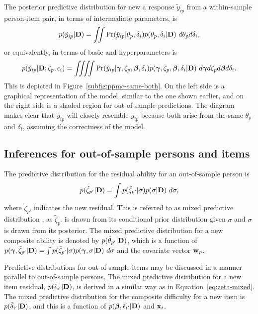 \documentclass[12pt, letterpaper]{article}
\begin{document}
The posterior predictive distribution \cite{rubin1984bayesianly} for new a response $\tilde y_{ip}$ from a within-sample person-item pair, in terms of intermediate parameters, is
\begin{equation}
	p(\tilde y_{ip} | \mathbf{D}) =
	\iint
		\Pr (\tilde y_{ip} | \theta_p, \delta_i)
		p(\theta_p, \delta_i | \mathbf{D})
	~d\theta_p d\delta_i
,\end{equation}
or equivalently, in terms of basic and hyperparameters is
\begin{equation} \label{eq:yrep-post}
	p(\tilde y_{ip} | \mathbf{D};  \zeta_p, \epsilon_i) =
	\iiiint
		\Pr (\tilde y_{ip} | \boldsymbol{\gamma}, \zeta_p, \boldsymbol{\beta}, \delta_i)
		p(\boldsymbol{\gamma}, \zeta_p, \boldsymbol{\beta}, \delta_i | \mathbf{D})
	~d\boldsymbol{\gamma} d\zeta_p d\boldsymbol{\beta} d\delta_i
.\end{equation}
This is depicted in Figure~\ref{subfig:ppmc-same-both}. On the left side is a graphical representation of the model, similar to the one shown earlier, and on the right side is a shaded region for out-of-sample predictions. The diagram makes clear that $\tilde y_{ip}$ will closely resemble $y_{ip}$ because both arise from the same $\theta_p$ and $\delta_i$, assuming the correctness of the model.


\subsection{Inferences for out-of-sample persons and items}

The predictive distribution for the residual ability for an out-of-sample person is
\begin{equation} \label{eq:zeta-mixed}
	p(\tilde \zeta_{p'} | \mathbf{D}) = 
	\int
		p(\tilde \zeta_{p'} | \sigma)
		p(\sigma | \mathbf{D})
	~d\sigma
,\end{equation}
where $\tilde \zeta_{p'}$ indicates the new residual. This is referred to as mixed predictive distribution \cite{Gelman1996}, as $\tilde \zeta_{p'}$ is drawn from its conditional prior distribution given $\sigma$ and $\sigma$ is drawn from its posterior. The mixed predictive distribution for a new composite ability is denoted by $p(\tilde \theta_{p'} | \mathbf{D})$, which is a function of 
	$p(\boldsymbol{\gamma}, \tilde \zeta_{p'} | \mathbf{D}) = 
	\int p(\tilde \zeta_{p'} | \sigma) p(\boldsymbol{\gamma}, \sigma | \mathbf{D}) ~d \sigma$
and the covariate vector $\mathbf{w}_p$.  

Predictive distributions for out-of-sample items may be discussed in a manner parallel to out-of-sample persons. The mixed predictive distribution for a new item residual, $p(\tilde \epsilon_{i'} | \mathbf{D})$, is derived in a similar way as in Equation~\ref{eq:zeta-mixed}. The mixed predictive distribution for the composite difficulty for a new item is $p(\tilde \delta_{i'} | \mathbf{D})$, and this is a function of $p(\boldsymbol{\beta}, \tilde \epsilon_{i'} | \mathbf{D})$ and $\mathbf{x}_i$.
\end{document}
